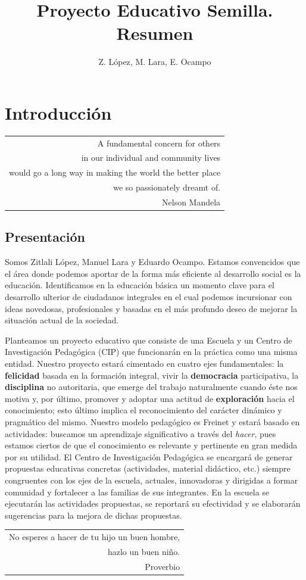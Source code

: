 \documentclass[10pt,letterpaper,oneside]{book}
\author{Z. López, M. Lara, E. Ocampo}
\title{Proyecto Educativo Semilla. Resumen}
\makeatletter
\newenvironment{myepigraph}
  {\par\hfill\itshape
   \begin{tabular}{@{}r@{\hspace{2em}}}} %
  {\end{tabular}\par\medskip}
\makeatother
\begin{document}
\maketitle
\tableofcontents

\chapter{Introducción}

\begin{myepigraph}A fundamental concern for others\\
in our individual and community lives\\
would go a long way in making the world the better place\\
we so passionately dreamt of.
\vspace{0.1cm}\\
Nelson Mandela
\end{myepigraph}

\section{Presentación}

Somos Zitlali López, Manuel Lara y Eduardo Ocampo. Estamos convencidos que el área donde podemos aportar de la forma más eficiente al desarrollo social es la educación. Identificamos en la educación básica un momento clave para el desarrollo ulterior de ciudadanos integrales en el cual podemos incursionar con ideas novedosas, profesionales y basadas en el más profundo deseo de mejorar la situación actual de la sociedad.

Planteamos un proyecto educativo que consiste de una Escuela y un Centro de Investigación Pedagógica (CIP) que funcionarán en la práctica como una misma entidad. Nuestro proyecto estará cimentado en cuatro ejes fundamentales: la {\bf felicidad} basada en la formación integral, vivir la {\bf democracia} participativa, la {\bf disciplina} no autoritaria, que emerge del trabajo naturalmente cuando éste nos motiva y, por último, promover y adoptar una actitud de {\bf exploración} hacia el conocimiento; esto último implica el reconocimiento del carácter dinámico y pragmático del mismo. Nuestro modelo pedagógico es Freinet y estará basado en actividades: buscamos un aprendizaje significativo a través del \emph{hacer}, pues estamos ciertos de que el conocimiento es relevante y pertinente en gran medida por su utilidad. El Centro de Investigación Pedagógica se encargará de generar propuestas educativas concretas (actividades, material didáctico, etc.) siempre congruentes con los ejes de la escuela, actuales, innovadoras y dirigidas a formar comunidad y fortalecer a las familias de sus integrantes. En la escuela se ejecutarán las actividades propuestas, se reportará su efectividad y se elaborarán sugerencias para la mejora de dichas propuestas.
\vspace{1cm}
\begin{myepigraph}No esperes a hacer de tu hijo un buen hombre,\\
hazlo un buen niño.
\vspace{0.1cm}\\
Proverbio
\end{myepigraph}
\end{document}
